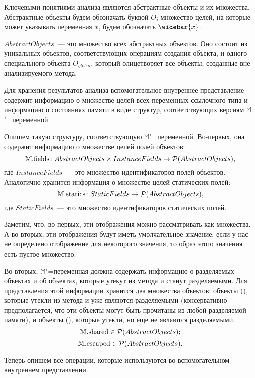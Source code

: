 \documentclass[14pt,titlepage,draft]{extarticle}
\newcommand{\M}{\ensuremath{\mathbb{M}}}
\newcommand{\Mfield}[1]{\ensuremath{\mathrm{#1}}}
\newcommand{\pts}[1]{\widebar{#1}}
\newcommand{\AO}[1]{O_{#1}}
\newcommand{\AOGlobal}{\AO{global}}
\begin{document}

    Ключевыми понятиями анализа являются абстрактные объекты и их множества.
    Абстрактные объекты будем обозначать буквой $O$; множество целей, на
    которые может указывать переменная $x$, будем обозначать $\pts{x}$.

    $AbstractObjects$~--- это множество всех абстрактных объектов. Оно
    состоит из уникальных объектов, соответствующих операциям создания
    объекта, и одного специального объекта $\AOGlobal$, который олицетворяет
    все объекты, созданные вне анализируемого метода.

    Для хранения результатов анализа вспомогательное внутреннее представление
    содержит информацию о множестве целей всех переменных ссылочного
    типа и информацию о состояниях памяти в виде структур, соответствующих
    версиям \M"=переменной.

    Опишем такую структуру, соответствующую \M"=переменной. Во-первых, она
    содержит информацию о множестве целей полей объектов:
    \[ \M.\Mfield{fields}\colon
      AbstractObjects \times InstanceFields \to
      \powerset{AbstractObjects},
    \]
    где $InstanceFields$~--- это множество идентификаторов полей
    объектов. Аналогично хранится информация о множестве целей статических
    полей:
    \[ \M.\Mfield{statics}\colon
      StaticFields \to \powerset{AbstractObjects},
    \]
    где $StaticFields$~--- это множество идентификаторов
    статических полей.

    Заметим, что, во-первых, эти отображения можно рассматривать как
    множества.  А во-вторых, эти отображения будут иметь умолчательное
    значение: если у нас не определено отображение для некоторого значения,
    то образ этого значения есть пустое множество.

    Во-вторых, \M"=переменная должна содержать информацию о разделяемых
    объектах и об объектах, которые утекут  из метода и станут
    разделяемыми. Для представления этой информации хранится два множества
    объектов: объекты (), которые утекли из метода и уже являются
    разделяемыми (консервативно предполагается, что эти объекты могут быть
    прочитаны из любой разделяемой памяти), и объекты (),
    которые утекли, но еще не являются разделяемыми.
    \[ \M.\Mfield{shared} \in \powerset{AbstractObjects}; \]
    \[ \M.\Mfield{escaped} \in \powerset{AbstractObjects}. \]

    Теперь опишем все операции, которые используются во вспомогательном
    внутреннем представлении.
\end{document}
